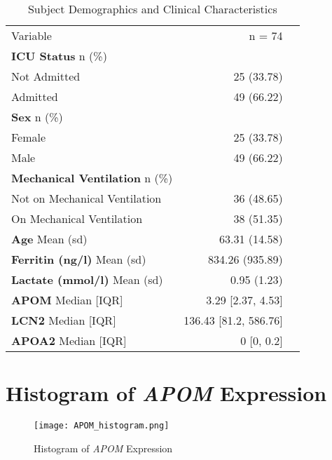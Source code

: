 \documentclass{article}
\begin{document}
\begin{table}[h]
\centering
\begin{tabular}{lrl}

Variable                   & n = 74                    &  \\ \cline{1-2}
\textbf{ICU Status} n (\%)          &                            &  \\
\hspace{3mm} Not Admitted       & 25 (33.78)                 &  \\
\hspace{3mm} Admitted                   & 49 (66.22)                 &  \\
\textbf{Sex} n (\%)                 &                            &  \\
\hspace{3mm} Female                     & 25 (33.78)                 &  \\
\hspace{3mm} Male                       & 49 (66.22)                 &  \\

\textbf{Mechanical Ventilation} n (\%)                 &                            &  \\
\hspace{3mm} Not on Mechanical Ventilation & 36 (48.65) \\
\hspace{3mm} On Mechanical Ventilation & 38 (51.35) \\
\textbf{Age} Mean (sd)              & 63.31 (14.58)              &  \\
\textbf{Ferritin (ng/l)} Mean (sd)  & 834.26  (935.89)              &  \\
\textbf{Lactate (mmol/l)} Mean (sd)  & 0.95  (1.23)              &  \\
\textbf{APOM} Median {[}IQR{]}  & 3.29 {[}2.37, 4.53{]}      &  \\
\textbf{LCN2} Median {[}IQR{]}  & 136.43 {[}81.2, 586.76{]} &  \\
\textbf{APOA2} Median {[}IQR{]} & 0 {[}0, 0.2{]}             & \\ \cline{1-2}
\end{tabular}
\caption{\label{Table1} Subject Demographics and Clinical Characteristics}
\end{table}

\newpage
\section{Histogram of \emph{APOM} Expression}
\begin{figure}[h]
    \centering
    \texttt{[image: APOM\_histogram.png]}
    \caption{Histogram of \emph{APOM} Expression}
    \label{fig:APOMhist}
\end{figure}
\end{document}
